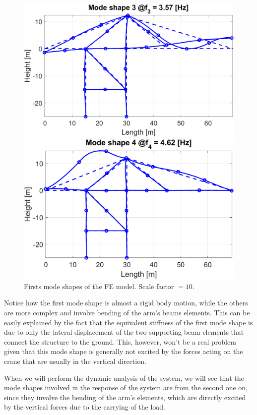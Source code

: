\begin{figure}[H]
\begin{minipage}[b]{0.45\textwidth}
        \centering
        \includegraphics[width=\textwidth]{img/MATLAB/ModeShapes/Mode_03.png}
    \end{minipage}
    \hfill
    \begin{minipage}[b]{0.45\textwidth}
        \centering
        \includegraphics[width=\textwidth]{img/MATLAB/ModeShapes/Mode_04.png}
    \end{minipage}
    \caption{Firsts mode shapes of the FE model. Scale factor $= 10$.}
    \label{fig:mode_shapes}
\end{figure}

Notice how the first mode shape is almost a rigid body motion, while the others are more complex and involve bending of the arm's beams elements.
This can be easily explained by the fact that the equivalent stiffness of the first mode shape is due to only the lateral displacement of the two supporting beam elements that connect the structure to the ground.
This, however, won't be a real problem given that this mode shape is generally not excited by the forces acting on the crane that are usually in the vertical direction.

When we will perform the dynamic analysis of the system, we will see that the mode shapes involved in the response of the system are from the second one on, since they involve the bending of the arm's elements, which are directly excited by the vertical forces due to the carrying of the load.